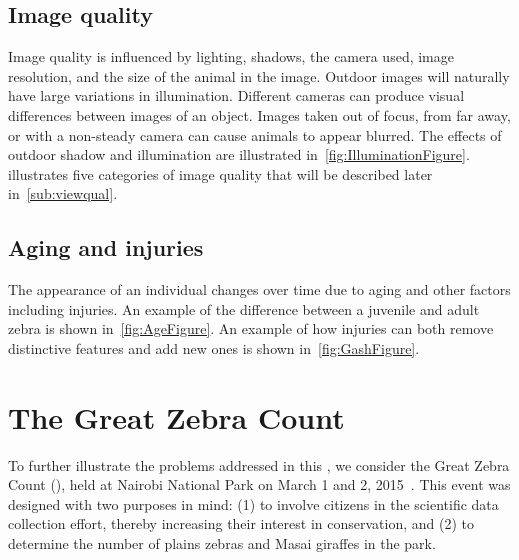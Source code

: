     \subsection{Image quality}
        Image quality is influenced by lighting, shadows, the camera used, image resolution, and the size of the animal
        in the image. Outdoor images will naturally have large variations in illumination. Different cameras can produce
        visual differences between images of an object. Images taken out of focus, from far away, or with a non-steady
        camera can cause animals to appear blurred. The effects of outdoor shadow and illumination are illustrated
        in~\cref{fig:IlluminationFigure}.  illustrates five categories of image quality that
        will be described later in~\cref{sub:viewqual}.

        \IlluminationFigure{}

        \QualityFigure{}

    \FloatBarrier{}
    \subsection{Aging and injuries}
        The appearance of an individual changes over time due to aging and other factors including injuries. An example
        of the difference between a juvenile and adult zebra is shown in~\cref{fig:AgeFigure}. An example of how
        injuries can both remove distinctive features and add new ones is shown in~\cref{fig:GashFigure}.

        \AgeFigure{}

        \GashFigure{}

\FloatBarrier{}
\section{The Great Zebra Count}\label{sec:introgzc}

    To further illustrate the problems addressed in this \thesis{}, we consider the Great Zebra Count (\GZC{}),
    held at Nairobi National Park on March 1\st{} and 2\nd{}, 2015~\cite{rubenstein_great_2015}. This event was
    designed with two purposes in mind: (1) to involve citizens in the scientific data collection effort, thereby
    increasing their interest in conservation, and (2) to determine the number of plains zebras and Masai giraffes
    in the park.

